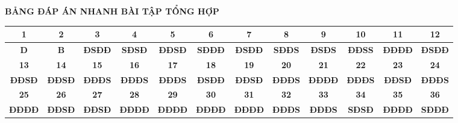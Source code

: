 \documentclass{article}
\begin{document}
\begin{center}
{\fontsize{26}{34}\selectfont \textbf{\color{brandGreen}BẢNG ĐÁP ÁN NHANH BÀI TẬP TỔNG HỢP}}\\[10pt]
\fontsize{18}{24}\selectfont
\begin{tabular}{|c|c|c|c|c|c|c|c|c|c|c|c|}
\hline
\textbf{1} & \textbf{2} & \textbf{3} & \textbf{4} & \textbf{5} & \textbf{6} & \textbf{7} & \textbf{8} & \textbf{9} & \textbf{10} & \textbf{11} & \textbf{12}\\
\hline
\textbf{D} & \textbf{B} & \textbf{ĐSĐĐ} & \textbf{SĐSĐ} & \textbf{ĐĐSĐ} & \textbf{SĐĐĐ} & \textbf{ĐSĐĐ} & \textbf{SĐĐS} & \textbf{ĐSĐS} & \textbf{ĐĐSS} & \textbf{ĐĐĐĐ} & \textbf{ĐSĐĐ}\\
\hline
\textbf{13} & \textbf{14} & \textbf{15} & \textbf{16} & \textbf{17} & \textbf{18} & \textbf{19} & \textbf{20} & \textbf{21} & \textbf{22} & \textbf{23} & \textbf{24}\\
\hline
\textbf{ĐĐSĐ} & \textbf{ĐĐSĐ} & \textbf{ĐĐĐS} & \textbf{ĐĐĐS} & \textbf{ĐĐĐS} & \textbf{ĐSĐĐ} & \textbf{ĐĐSĐ} & \textbf{ĐĐĐS} & \textbf{ĐĐĐĐ} & \textbf{ĐĐĐS} & \textbf{ĐĐSĐ} & \textbf{ĐĐĐS}\\
\hline
\textbf{25} & \textbf{26} & \textbf{27} & \textbf{28} & \textbf{29} & \textbf{30} & \textbf{31} & \textbf{32} & \textbf{33} & \textbf{34} & \textbf{35} & \textbf{36}\\
\hline
\textbf{ĐĐĐĐ} & \textbf{ĐĐSĐ} & \textbf{ĐĐSĐ} & \textbf{ĐĐĐĐ} & \textbf{ĐĐĐĐ} & \textbf{ĐĐĐĐ} & \textbf{ĐĐĐĐ} & \textbf{ĐĐĐS} & \textbf{ĐĐĐS} & \textbf{SĐSĐ} & \textbf{ĐĐĐĐ} & \textbf{SĐĐĐ}\\
\hline
\end{tabular}
\end{center}
\vspace*{\fill}
\newpage
\end{document}
